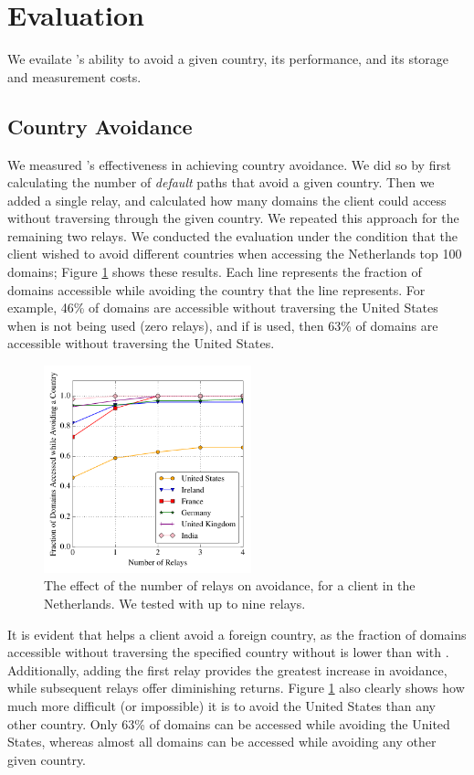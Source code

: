\section{Evaluation}

We evailate \system{}'s ability to avoid a given country, its performance,
and its storage and measurement costs.

\subsection{Country Avoidance}

We measured \system{}'s effectiveness in achieving country avoidance.  We did so by first 
calculating the number of {\it default} paths that avoid a given country.  Then 
we added a single relay, and calculated how many domains the client could 
access without traversing through the given country.  We repeated this approach for 
the remaining two relays.  We conducted the evaluation under the condition that 
the client wished to avoid different countries when accessing the Netherlands top 
100 domains; Figure \ref{fig:avoidance_eval} shows these results.  Each 
line represents the fraction of domains accessible while avoiding the country that 
the line represents.  For example, 46\% of domains are accessible without traversing 
the United States when \system{} is not being used (zero relays), and if \system{} is 
used, then 63\% of domains are accessible without traversing the United States.

\begin{figure}[t!]
\tiny
\centering
\includegraphics[width=.5\textwidth,height=6cm]{avoidance_n_relays}
\caption{The effect of the number of relays on avoidance, for a client
  in the Netherlands. We tested \system{} with up to nine relays.}
\label{fig:avoidance_eval}
\end{figure}

It is evident that \system{} helps a client avoid a foreign country, as the 
fraction of domains accessible without traversing 
the specified country without \system{} is lower than with \system{}.  Additionally, 
adding the first relay provides the greatest increase in 
avoidance, while subsequent relays offer diminishing returns.
Figure \ref{fig:avoidance_eval} also clearly shows how much more difficult (or 
impossible) it is to avoid the United States than any other 
country.  Only 63\% of domains can be accessed while avoiding the United States, 
whereas almost all domains can be accessed while avoiding any other given 
country.  

